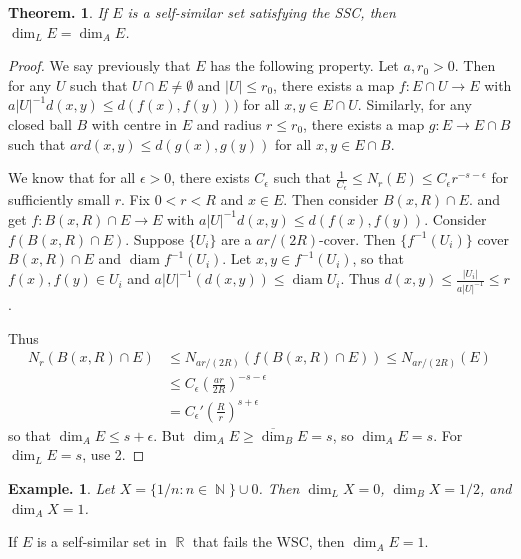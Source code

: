\documentclass[11pt, a4paper]{memoir}
\DeclareMathOperator{\N}{{\mathbb{N}}}
\DeclareMathOperator{\R}{{\mathbb{R}}}
\theoremstyle{change}
\newtheorem{theorem}{Theorem.}[section]
\theoremstyle{plain}
\theoremstyle{nonumberplain}
\newtheorem{example}{Example.}
\newtheorem{proof}{Proof}
\DeclareMathOperator{\diam}{diam}
\numberwithin{equation}{section}
\begin{document}
\begin{theorem}
    If $E$ is a self-similar set satisfying the SSC, then $\dim_L E=\dim_A E$.
\end{theorem}
\begin{proof}
    We say previously that $E$ has the following property.
    Let $a,r_0>0$.
    Then for any $U$ such that $U\cap E\neq\emptyset$ and $|U|\leq r_0$, there exists a map $f:E\cap U\to E$ with $a|U|^{-1}d(x,y)\leq d(f(x),f(y)))$ for all $x,y\in E\cap U$.
    Similarly, for any closed ball $B$ with centre in $E$ and radius $r\leq r_0$, there exists a map $g:E\to E\cap B$ such that $ard(x,y)\leq d(g(x),g(y))$ for all $x,y\in E\cap B$.

    We know that for all $\epsilon>0$, there exists $C_\epsilon$ such that $\frac{1}{C_\epsilon}\leq N_r(E)\leq C_\epsilon r^{-s-\epsilon}$ for sufficiently small $r$.
    Fix $0<r<R$ and $x\in E$.
    Then consider $B(x,R)\cap E$. and get $f:B(x,R)\cap E\to E$ with $a|U|^{-1}d(x,y)\leq d(f(x),f(y))$.
    Consider $f(B(x,R)\cap E)$.
    Suppose $\{U_i\}$ are a $ar/(2R)$-cover.
    Then $\{f^{-1}(U_i)\}$ cover $B(x,R)\cap E$ and $\diam f^{-1}(U_i)$.
    Let $x,y\in f^{-1}(U_i)$, so that $f(x),f(y)\in U_i$ and $a|U|^{-1}(d(x,y))\leq\diam U_i$.
    Thus $d(x,y)\leq \frac{|U_i|}{a|U|^{-1}}\leq r$.

    Thus
    \begin{align*}
        N_r(B(x,R)\cap E)&\leq N_{ar/(2R)}(f(B(x,R)\cap E))\leq N_{ar/(2R)}(E)\\
                         &\leq C_\epsilon\left(\frac{ar}{2R}\right)^{-s-\epsilon}\\
                         &= C_\epsilon'\left(\frac{R}{r}\right)^{s+\epsilon}
    \end{align*}
    so that $\dim_A E\leq s+\epsilon$.
    But $\dim_A E\geq\overline{\dim}_B E=s$, so $\dim_A E=s$.
    For $\dim_L E=s$, use 2.
\end{proof}
\begin{example}
    Let $X=\{1/n:n\in\N\}\cup 0$.
    Then $\dim_L X=0$, $\dim_B X=1/2$, and $\dim_A X=1$.
\end{example}
If $E$ is a self-similar set in $\R$ that fails the WSC, then $\dim_A E=1$.
\end{document}
